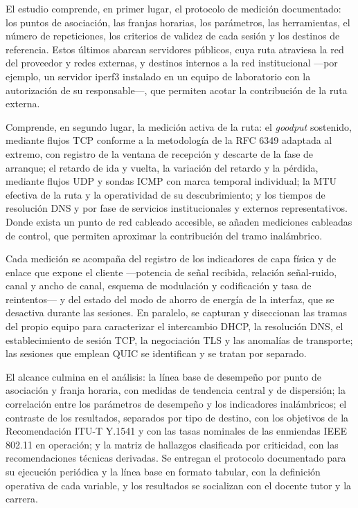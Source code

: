 El estudio comprende, en primer lugar, el protocolo de medición documentado: los puntos de asociación, las franjas horarias, los parámetros, las herramientas, el número de repeticiones, los criterios de validez de cada sesión y los destinos de referencia. Estos últimos abarcan servidores públicos, cuya ruta atraviesa la red del proveedor y redes externas, y destinos internos a la red institucional ---por ejemplo, un servidor iperf3 instalado en un equipo de laboratorio con la autorización de su responsable---, que permiten acotar la contribución de la ruta externa.

Comprende, en segundo lugar, la medición activa de la ruta: el \textit{goodput} sostenido, mediante flujos TCP conforme a la metodología de la RFC 6349 adaptada al extremo, con registro de la ventana de recepción y descarte de la fase de arranque; el retardo de ida y vuelta, la variación del retardo y la pérdida, mediante flujos UDP y sondas ICMP con marca temporal individual; la MTU efectiva de la ruta y la operatividad de su descubrimiento; y los tiempos de resolución DNS y por fase de servicios institucionales y externos representativos. Donde exista un punto de red cableado accesible, se añaden mediciones cableadas de control, que permiten aproximar la contribución del tramo inalámbrico.

Cada medición se acompaña del registro de los indicadores de capa física y de enlace que expone el cliente ---potencia de señal recibida, relación señal-ruido, canal y ancho de canal, esquema de modulación y codificación y tasa de reintentos--- y del estado del modo de ahorro de energía de la interfaz, que se desactiva durante las sesiones. En paralelo, se capturan y diseccionan las tramas del propio equipo para caracterizar el intercambio DHCP, la resolución DNS, el establecimiento de sesión TCP, la negociación TLS y las anomalías de transporte; las sesiones que emplean QUIC se identifican y se tratan por separado.

El alcance culmina en el análisis: la línea base de desempeño por punto de asociación y franja horaria, con medidas de tendencia central y de dispersión; la correlación entre los parámetros de desempeño y los indicadores inalámbricos; el contraste de los resultados, separados por tipo de destino, con los objetivos de la Recomendación ITU-T Y.1541 y con las tasas nominales de las enmiendas IEEE 802.11 en operación; y la matriz de hallazgos clasificada por criticidad, con las recomendaciones técnicas derivadas. Se entregan el protocolo documentado para su ejecución periódica y la línea base en formato tabular, con la definición operativa de cada variable, y los resultados se socializan con el docente tutor y la carrera.

